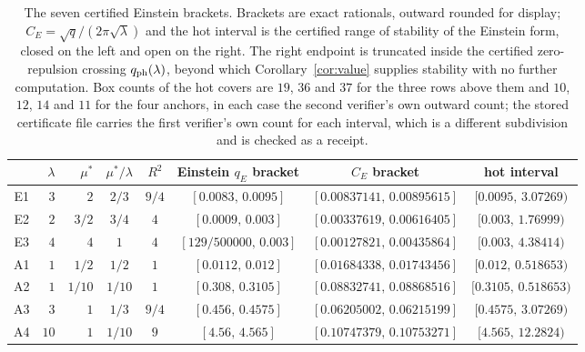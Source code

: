\documentclass[11pt]{article}
\newcommand{\muS}{\mu^{*}}
\theoremstyle{definition}
\theoremstyle{remark}
\begin{document}
\begin{table}[t]
\centering
\footnotesize
\setlength{\tabcolsep}{5pt}
\renewcommand{\arraystretch}{1.15}
\begin{tabular}{@{}crrccccc@{}}
\toprule
 & $\lambda$ & $\muS$ & $\muS/\lambda$ & $R^2$ & Einstein $q_E$ bracket & $C_E$ bracket & hot interval\\
\midrule
E1 & $3$ & $2$ & $2/3$ & $9/4$ & $[0.0083,\,0.0095]$ & $[0.00837141,\,0.00895615]$ & $[0.0095,\,3.07269)$\\
E2 & $2$ & $3/2$ & $3/4$ & $4$ & $[0.0009,\,0.003]$ & $[0.00337619,\,0.00616405]$ & $[0.003,\,1.76999)$\\
E3 & $4$ & $4$ & $1$ & $4$ & $[129/500000,\,0.003]$ & $[0.00127821,\,0.00435864]$ & $[0.003,\,4.38414)$\\
A1 & $1$ & $1/2$ & $1/2$ & $1$ & $[0.0112,\,0.012]$ & $[0.01684338,\,0.01743456]$ & $[0.012,\,0.518653)$\\
A2 & $1$ & $1/10$ & $1/10$ & $1$ & $[0.308,\,0.3105]$ & $[0.08832741,\,0.08868516]$ & $[0.3105,\,0.518653)$\\
A3 & $3$ & $1$ & $1/3$ & $9/4$ & $[0.456,\,0.4575]$ & $[0.06205002,\,0.06215199]$ & $[0.4575,\,3.07269)$\\
A4 & $10$ & $1$ & $1/10$ & $9$ & $[4.56,\,4.565]$ & $[0.10747379,\,0.10753271]$ & $[4.565,\,12.2824)$\\
\bottomrule
\end{tabular}
\caption{The seven certified Einstein brackets. Brackets are exact rationals, outward
rounded for display; $C_E=\sqrt q/(2\pi\sqrt\lambda)$ and the hot interval is the certified
range of stability of the Einstein form, closed on the left and open on the right. The right
endpoint is truncated inside the certified zero-repulsion crossing $q_{\rm ph}(\lambda)$,
beyond which Corollary~\ref{cor:value} supplies stability with no further computation. Box
counts of the hot covers are $19$, $36$ and $37$ for the three rows above them and
$10$, $12$, $14$ and $11$ for the four anchors, in each case the second verifier's own
outward count; the stored certificate file carries the first verifier's own count for each
interval, which is a different subdivision and is checked as a receipt.}
\label{tab:brackets}
\end{table}
\end{document}
